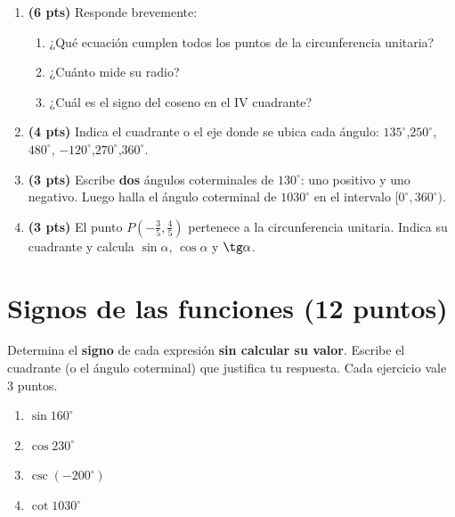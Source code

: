 \documentclass[12pt, letterpaper]{article}
\providecommand{\sen}{\sin}
\begin{document}
\begin{enumerate}[leftmargin=*, label=\textbf{\arabic*.}, itemsep=0.4em]
  \item \textbf{(6 pts)} Responde brevemente:
        \begin{enumerate}[label=\alph*), leftmargin=1.6em, nosep]
          \item ¿Qué ecuación cumplen todos los puntos de la circunferencia unitaria?
          \item ¿Cuánto mide su radio?
          \item ¿Cuál es el signo del coseno en el IV cuadrante?
        \end{enumerate}

  \item \textbf{(4 pts)} Indica el cuadrante o el eje donde se ubica cada ángulo:
        $135^\circ$,\quad $250^\circ$,\quad $480^\circ$,\quad
        $-120^\circ$,\quad $270^\circ$,\quad $360^\circ$.

  \item \textbf{(3 pts)} Escribe \textbf{dos} ángulos coterminales de $130^\circ$:
        uno positivo y uno negativo. Luego halla el ángulo coterminal de
        $1030^\circ$ en el intervalo $[0^\circ,360^\circ)$.

  \item \textbf{(3 pts)} El punto $P\!\left(-\frac{3}{5},\frac{4}{5}\right)$
        pertenece a la circunferencia unitaria. Indica su cuadrante y calcula
        $\sen\alpha$, $\cos\alpha$ y $\tg\alpha$.
\end{enumerate}

\newpage
\section{Signos de las funciones (12 puntos)}

\begin{cuadroinfo}
  \small
  Determina el \textbf{signo} de cada expresión \textbf{sin calcular su valor}.
  Escribe el cuadrante (o el ángulo coterminal) que justifica tu respuesta.
  Cada ejercicio vale 3 puntos.
\end{cuadroinfo}

\begin{enumerate}[leftmargin=*, label=\textbf{\alph*)}, itemsep=1.1em]
  \item $\sen 160^\circ$
  \item $\cos 230^\circ$
  \item $\csc(-200^\circ)$
  \item $\cot 1030^\circ$
\end{enumerate}
\end{document}

